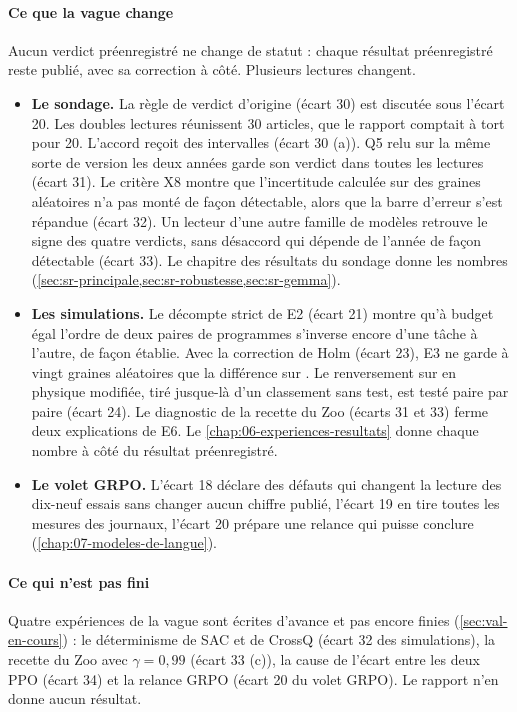 \paragraph{Ce que la vague change} Aucun verdict préenregistré ne change de statut : chaque résultat
préenregistré reste publié, avec sa correction à côté. Plusieurs lectures changent.
\begin{itemize}
  \item \textbf{Le sondage.} La règle de verdict d'origine (écart 30) est discutée sous l'écart 20.
        Les doubles lectures réunissent 30 articles, que le rapport comptait à tort pour 20. L'accord reçoit des intervalles (écart 30 (a)). Q5 relu sur la même sorte de version les deux années garde son verdict
        dans toutes les lectures (écart 31). Le critère X8 montre que l'incertitude calculée sur des
        graines aléatoires n'a pas monté de façon détectable, alors que la barre d'erreur s'est
        répandue (écart 32). Un lecteur d'une autre famille de modèles retrouve le signe des quatre
        verdicts, sans désaccord qui dépende de l'année de façon détectable (écart 33). Le chapitre
        des résultats du sondage donne les nombres
        (\cref{sec:sr-principale,sec:sr-robustesse,sec:sr-gemma}).
  \item \textbf{Les simulations.} Le décompte strict de E2 (écart 21) montre qu'à budget égal
        l'ordre de deux paires de programmes s'inverse encore d'une tâche à l'autre, de façon
        établie. Avec la correction de Holm (écart 23), E3 ne garde à vingt graines aléatoires que
        la différence sur . Le renversement sur  en physique modifiée,
        tiré jusque-là d'un classement sans test, est testé paire par paire (écart 24).
        Le diagnostic de la recette du Zoo (écarts 31 et 33) ferme deux explications de E6. Le
        \cref{chap:06-experiences-resultats} donne chaque nombre à côté du résultat préenregistré.
  \item \textbf{Le volet GRPO.} L'écart 18 déclare des défauts qui changent la lecture des
        dix-neuf essais sans changer aucun chiffre publié, l'écart 19 en tire toutes les mesures
        des journaux, l'écart 20 prépare une relance qui puisse conclure
        (\cref{chap:07-modeles-de-langue}).
\end{itemize}

\paragraph{Ce qui n'est pas fini} Quatre expériences de la vague sont écrites d'avance et pas encore
finies (\cref{sec:val-en-cours}) : le déterminisme de SAC et de CrossQ (écart 32 des simulations), la
recette du Zoo avec $\gamma = 0{,}99$ (écart 33 (c)), la cause de l'écart entre les deux PPO (écart
34) et la relance GRPO (écart 20 du volet GRPO). Le rapport n'en donne aucun résultat.

